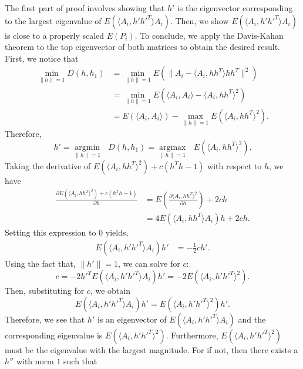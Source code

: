 \documentclass[10pt,journal,compsoc]{IEEEtran}
\newenvironment{proof}[1][Proof]{\begin{trivlist}
		\item[\hskip \labelsep {\bfseries #1}]}{\end{trivlist}}
\begin{document}
\begin{proof} [Proof of Theorem 4.2]
The first part of proof involves showing that $h'$ is the eigenvector corresponding to the largest eigenvalue of $E(\langle A_{i},h' h'^T \rangle A_{i})$. Then, we show $E(\langle A_{i},h' h'^T \rangle A_{i})$ is close to a properly scaled $E(P_i)$. To conclude, we apply the Davis-Kahan theorem to the top eigenvector of both matrices to obtain the desired result. First, we notice that
	\begin{align*}
	\underset{\|h\| =1}{\operatorname{min}}D(h,h_1) &=\underset{\|h\| =1}{\operatorname{min}}E(\|A_i- \langle A_i,h h^T \rangle h h^T\|^2) \\
	&=\underset{\|h\| =1}{\operatorname{min}}E(\langle A_i,A_i \rangle- \langle A_i,h h^T \rangle ^2) \\
	&=E(\langle A_i,A_i \rangle)-\underset{\|h\| =1}{\operatorname{max}}E( \langle A_i,h h^T \rangle ^2).
	\end{align*}
	Therefore, 
	\begin{equation} \label{eq:5}
	h'= \underset{\|h\| =1}{\operatorname{argmin}} \text{ }D(h,h_1)=\underset{\|h\| =1}{\operatorname{argmax}} \text{ } E(\langle A_i,h h^T \rangle ^2) .
	\end{equation}
	Taking the derivative of $E( \langle A_i,h h^T \rangle ^2)+ c(h^Th-1)$ with respect to $h$, we have 
	\begin{align*}
	\frac{\partial E( \langle A_i,h h^T \rangle ^2)+ c(h^Th-1) }{\partial h} & =  E(\frac{\partial  \langle A_i,h h^T \rangle ^2}{\partial h}) +2ch \\
	&=4 E( \langle A_i,h h^T \rangle A_i)h +2ch .
	\end{align*}
	Setting this expression to $0$ yields,
	\begin{align*} 
	E( \langle A_i,h' h'^T \rangle A_i)h' & = -\frac{1}{2}ch' .
	\end{align*}
	Using the fact that, $\|h'\|=1$, we can solve for $c$:
	\[c = -2 h'^T E( \langle A_i,h' h'^T \rangle A_i)h' = -2 E( \langle A_i,h' h'^T \rangle^2) .\]
	Then, substituting for $c$, we obtain
	\begin{equation}
	E( \langle A_i,h' h'^T \rangle A_i)h'=E( \langle A_i,h' h'^T \rangle^2)h'.
	\end{equation}
	Therefore, we see that $h'$ is an eigenvector of $E(\langle A_{i},h' h'^T \rangle A_{i})$ and the corresponding eigenvalue is $E(\langle A_{i},h' h'^T \rangle ^2)$. Furthermore, $E(\langle A_{i},h' h'^T \rangle ^2)$ must be the eigenvalue with the largest magnitude. For if not, then there exists a $h''$ with norm $1$ such that

\end{proof}
\end{document}
